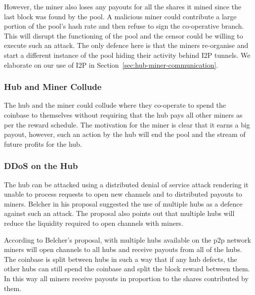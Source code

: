 \documentclass{article}
\begin{document}
However, the miner also loses any payouts for all the shares it mined
since the last block was found by the pool. A malicious miner could
contribute a large portion of the pool's hash rate and then refuse to
sign the co-operative branch. This will disrupt the functioning of the
pool and the censor could be willing to execute such an attack. The
only defence here is that the miners re-organise and start a different
instance of the pool hiding their activity behind I2P tunnels. We
elaborate on our use of I2P in
Section~\ref{sec:hub-miner-communication}.

\subsubsection{Hub and Miner Collude}\label{ref:collusion}

The hub and the miner could collude where they co-operate to spend the
coinbase to themselves without requiring that the hub pays all other
miners as per the reward schedule. The motivation for the miner is
clear that it earns a big payout, however, such an action by the hub
will end the pool and the stream of future profits for the hub.


\subsubsection{DDoS on the Hub}\label{ref:ddos-attack}

The hub can be attacked using a distributed denial of service attack
rendering it unable to process requests to open new channels and to
distributed payouts to miners. Belcher in his proposal suggested the
use of multiple hubs as a defence against such an attack. The proposal
also points out that multiple hubs will reduce the liquidity required
to open channels with miners.

According to Belcher's proposal, with multiple hubs available on the
p2p network miners will open channels to all hubs and receive payouts
from all of the hubs. The coinbase is split between hubs in such a way
that if any hub defects, the other hubs can still spend the coinbase
and split the block reward between them. In this way all miners
receive payouts in proportion to the shares contributed by them.
\end{document}
